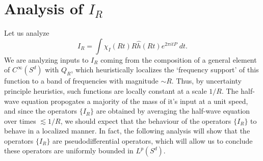 \documentclass[dvipsnames,letterpaper,12pt]{article}
\begin{document}
\section{Analysis of $I_R$}

Let us analyze
%
\[ I_R = \int \chi_I(Rt) R \widehat{h}(Rt) e^{2 \pi i t P}\; dt. \]
%
We are analyzing inputs to $I_R$ coming from the composition of a general element of $C^\infty(S^d)$ with $Q_R$, which heuristically localizes the `frequency support' of this function to a band of frequencies with magnitude $\sim R$. Thus, by uncertainty principle heuristics, such functions are locally constant at a scale $1/R$. The half-wave equation propogates a majority of the mass of it's input at a unit speed, and since the operators $\{ I_R \}$ are obtained by averaging the half-wave equation over times $\lesssim 1/R$, we should expect that the behaviour of the operators $\{ I_R \}$ to behave in a localized manner. In fact, the following analysis will show that the operators $\{ I_R \}$ are pseudodifferential operators, which will allow us to conclude these operators are uniformly bounded in $L^p(S^d)$.
\end{document}
